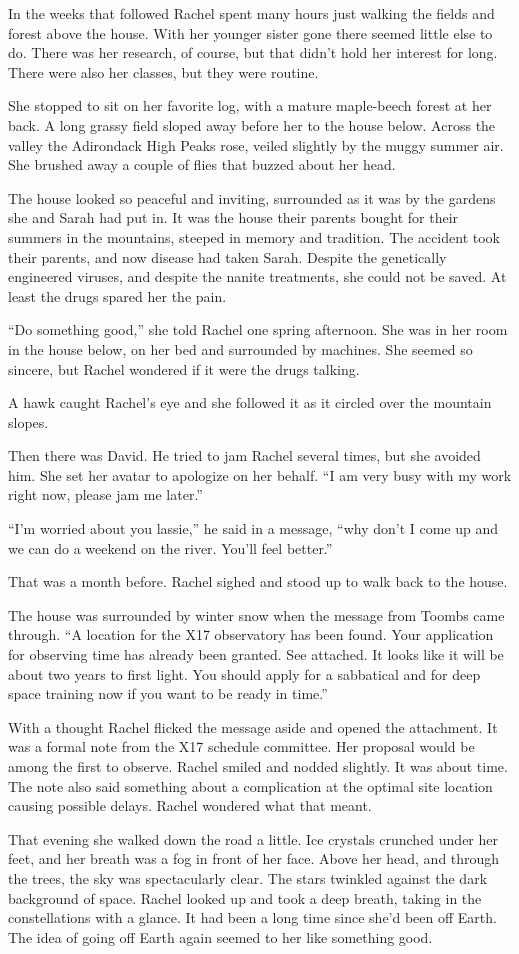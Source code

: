 In the weeks that followed Rachel spent many hours just walking the fields and forest above the
house. With her younger sister gone there seemed little else to do. There was her research, of
course, but that didn't hold her interest for long. There were also her classes, but they were
routine.

She stopped to sit on her favorite log, with a mature maple-beech forest at her back. A long
grassy field sloped away before her to the house below. Across the valley the Adirondack High
Peaks rose, veiled slightly by the muggy summer air. She brushed away a couple of flies that
buzzed about her head.

The house looked so peaceful and inviting, surrounded as it was by the gardens she and Sarah had
put in. It was the house their parents bought for their summers in the mountains, steeped in
memory and tradition. The accident took their parents, and now disease had taken Sarah. Despite
the genetically engineered viruses, and despite the nanite treatments, she could not be saved.
At least the drugs spared her the pain.

``Do something good,'' she told Rachel one spring afternoon. She was in her room in the house
below, on her bed and surrounded by machines. She seemed so sincere, but Rachel wondered if it
were the drugs talking.

A hawk caught Rachel's eye and she followed it as it circled over the mountain slopes.

Then there was David. He tried to jam Rachel several times, but she avoided him. She set her
avatar to apologize on her behalf. ``I am very busy with my work right now, please jam me
later.''

``I'm worried about you lassie,'' he said in a message, ``why don't I come up and we can do a
weekend on the river. You'll feel better.''

That was a month before. Rachel sighed and stood up to walk back to the house.

The house was surrounded by winter snow when the message from Toombs came through. ``A location
for the X17 observatory has been found. Your application for observing time has already been
granted. See attached. It looks like it will be about two years to first light. You should apply
for a sabbatical and for deep space training now if you want to be ready in time.''

With a thought Rachel flicked the message aside and opened the attachment. It was a formal
note from the X17 schedule committee. Her proposal would be among the first to observe. Rachel
smiled and nodded slightly. It was about time. The note also said something about a complication
at the optimal site location causing possible delays. Rachel wondered what that meant.

That evening she walked down the road a little. Ice crystals crunched under her feet, and her
breath was a fog in front of her face. Above her head, and through the trees, the sky was
spectacularly clear. The stars twinkled against the dark background of space. Rachel looked up
and took a deep breath, taking in the constellations with a glance. It had been a long time
since she'd been off Earth. The idea of going off Earth again seemed to her like something good.
